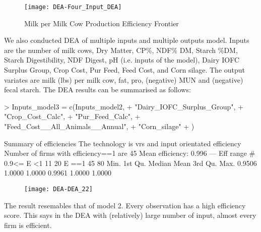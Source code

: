 \documentclass[12pt,]{article}
\begin{document}
\begin{figure}[h]
\texttt{[image: DEA-Four\_Input\_DEA]}
\caption{Milk per Milk Cow Production Efficiency Frontier}
\end{figure}


We also conducted DEA of multiple inputs and multiple outputs model. Inputs are the number of milk cows, Dry Matter, CP\%, NDF\% DM, Starch \%DM, Starch Digestibility, NDF Digest, pH (i.e. inputs of the model), Dairy IOFC Surplus Group, Crop Cost, Pur Feed, Feed Cost, and Corn silage. The output variates are milk (lbs) per milk cow, fat, pro, (negative) MUN and (negative) fecal starch. The DEA results can be summarised as follows:
\begin{Schunk}
\begin{Sinput}
> Inputs_model3 = c(Inputs_model2,
+                   "Dairy_IOFC_Surplus_Group",
+                   "Crop_Cost_Calc",
+                   "Pur_Feed_Calc",
+                   "Feed_Cost__All_Animals__Annual",
+                   "Corn_silage"
+                   )
\end{Sinput}
\end{Schunk}

\begin{Schunk}
\begin{Soutput}
Summary of efficiencies
The technology is vrs and input orientated efficiency
Number of firms with efficiency==1 are 45 
Mean efficiency: 0.996 
---                
  Eff range       #  %
  0.9<= E <1     11 20
        E ==1    45 80
   Min. 1st Qu.  Median    Mean 3rd Qu.    Max. 
 0.9506  1.0000  1.0000  0.9961  1.0000  1.0000 
\end{Soutput}
\end{Schunk}


\begin{figure}[h]
\texttt{[image: DEA-DEA\_22]}
\end{figure}

The result resemables that of model 2. Every observation has a high efficiency score. This says in the DEA with (relatively) large number of input, almost every firm is efficient.
\end{document}
